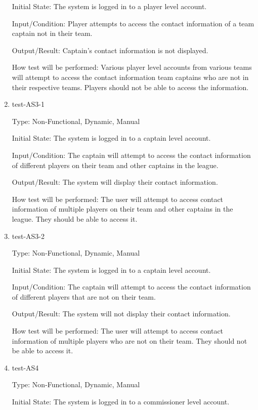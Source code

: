 \documentclass[12pt, titlepage]{article}
\begin{document}
\begin{enumerate}
  Initial State: The system is logged in to a player level account.

  Input/Condition: Player attempts to access the contact information of a 
  team captain not in their team.

  Output/Result: Captain's contact information is not displayed.

  How test will be performed: Various player level accounts from various teams 
  will attempt to access the contact information team captains who are not 
  in their respective teams. Players should not be able to access the information.

  \item{test-AS3-1\\}

  Type: Non-Functional, Dynamic, Manual

  Initial State: The system is logged in to a captain level account.

  Input/Condition: The captain will attempt to access the contact information
  of different players on their team and other captains in the league.

  Output/Result: The system will display their contact information.

  How test will be performed: The user will attempt to access contact
  information of multiple players on their team and other captains in the
  league. They should be able to access it.

  \item{test-AS3-2\\}

  Type: Non-Functional, Dynamic, Manual

  Initial State: The system is logged in to a captain level account.

  Input/Condition: The captain will attempt to access the contact information
  of different players that are not on their team.

  Output/Result: The system will not display their contact information.

  How test will be performed: The user will attempt to access contact
  information of multiple players who are not on their team. They should not
  be able to access it.

  \item{test-AS4\\}

  Type: Non-Functional, Dynamic, Manual

  Initial State: The system is logged in to a commissioner level account.


\end{enumerate}
\end{document}
